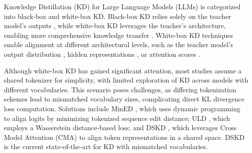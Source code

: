 \label{Related_work}
Knowledge Distillation (KD) for Large Language Models (LLMs) is categorized into black-box and white-box KD. Black-box KD relies solely on the teacher model's outputs \cite{fu2023specializing, kim2016sequence}, while white-box KD leverages the teacher's architecture, enabling more comprehensive knowledge transfer \cite{wen2023f, gu2024minillm, ko2024distillm}. White-box KD techniques enable alignment at different architectural levels, such as the teacher model's output distribution \cite{song2020lightpaff, liang2020mixkd}, hidden representations \cite{jiao2019tinybert, sun2019patient}, or attention scores \cite{wang2020minilm}. %

Although white-box KD has gained significant attention, most studies assume a shared tokenizer for simplicity, with limited exploration of KD across models with different vocabularies. This scenario poses challenges, as differing tokenization schemes lead to mismatched vocabulary sizes, complicating direct KL divergence loss computation. Solutions include MinED \cite{wan2024knowledge}, which uses dynamic programming to align logits by minimizing tokenized sequence edit distance; ULD \cite{boizard2024towards}, which employs a Wasserstein distance-based loss; and DSKD \cite{zhang2024dual}, which leverages Cross Model Attention (CMA) to align token representations in a shared space. DSKD is the current state-of-the-art for KD with mismatched vocabularies.



